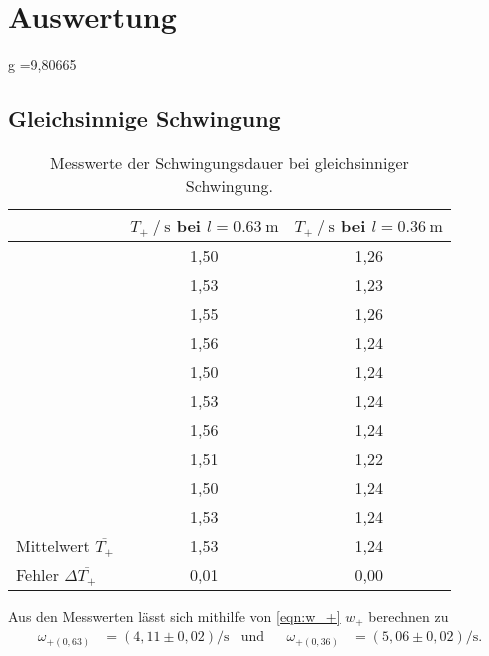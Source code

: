 \section{Auswertung}
\label{sec:Auswertung}

g =9,80665
\subsection{Gleichsinnige Schwingung}
\label{subsec:aus_gleich}

\begin{table}[H]
  \centering
  \caption{Messwerte der Schwingungsdauer bei gleichsinniger Schwingung.}
  \label{tab:T+}
  \begin{tabular}{l S S}
    \toprule
     & {$T_+ \mathbin{/} \si{\second}$ bei $l=\qty{0.63}{\meter}$} & {$T_+ \mathbin{/} \si{\second}$ bei $l=\qty{0.36}{\meter}$}\\
    \midrule
      &1,50 & 1,26\\
      &1,53 & 1,23\\
      &1,55 & 1,26\\
      &1,56 & 1,24\\
      &1,50 & 1,24\\
      &1,53 & 1,24\\
      &1,56 & 1,24\\
      &1,51 & 1,22\\
      &1,50 & 1,24\\
      &1,53 & 1,24\\
    \midrule
      Mittelwert $\overline{T_+}$& 1,53 & 1,24\\
      Fehler $\Delta \overline{T_+}$& 0,01 & 0,00\\
    \bottomrule
  \end{tabular}
\end{table}

Aus den Messwerten lässt sich mithilfe von \autoref{eqn:w_+} $w_+$ berechnen zu 
\begin{align*}
  \omega_{+(0,63)}&=(4,11 \pm 0,02) \si{\per\second} & \text{und} && \omega_{+(0,36)}&=(5,06 \pm 0,02) \si{\per\second}.
\end{align*}

